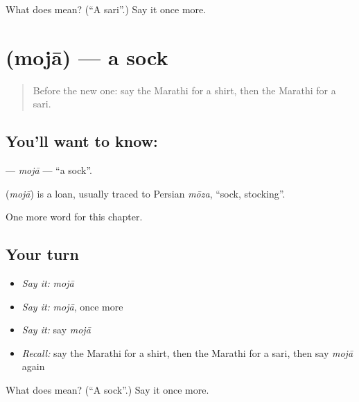 \begin{tcolorbox}[breakable,colback=teal!4,colframe=teal!35!black,title={Before you move on}]
What does  mean? (\textquotedblleft{}A sari\textquotedblright{}.) Say it once more.
\end{tcolorbox}
\section[\texorpdfstring{\mr{मोजा} (mojā)}{मोजा (mojā)}]{ (mojā) — a sock}

\label{lesson:MR-C116-moja}



\begin{quote}
Before the new one: say the Marathi for a shirt, then the Marathi for a sari.
\end{quote}

\subsection*{You'll want to know: }
\textbf{} — \emph{mojā} — \textquotedblleft{}a sock\textquotedblright{}.

\begin{cousinweb}
\textbf{} (\emph{mojā}) is a loan, usually traced to Persian \emph{mōza}, \textquotedblleft{}sock, stocking\textquotedblright{}.
\end{cousinweb}

\begin{grammarlens}[title={What you've built}]
One more word for this chapter.
\end{grammarlens}

\subsection*{Your turn}
\begin{itemize}
\raggedright
  \item \emph{Say it:} \emph{mojā}
  \item \emph{Say it:} \emph{mojā}, once more
  \item \emph{Say it:} say \emph{mojā}
  \item \emph{Recall:} say the Marathi for a shirt, then the Marathi for a sari, then say \emph{mojā} again
\end{itemize}

\begin{tcolorbox}[breakable,colback=teal!4,colframe=teal!35!black,title={Before you move on}]
What does  mean? (\textquotedblleft{}A sock\textquotedblright{}.) Say it once more.
\end{tcolorbox}
